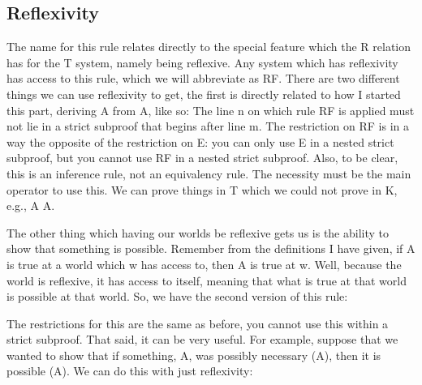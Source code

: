 \subsection{Reflexivity}

The name for this rule relates directly to the special feature which the R relation has for the T system, namely being reflexive. Any system which has reflexivity has access to this rule, which we will abbreviate as RF. There are two different things we can use reflexivity to get, the first is directly related to how I started this part, deriving A from \ebox A, like so:
The line n on which rule RF is applied must not lie in a strict subproof that begins after line m. The restriction on RF is in a way the opposite of the restriction on \ebox E: you can only use \ebox E in a nested strict subproof, but you cannot use RF in a nested strict subproof. Also, to be clear, this is an inference rule, not an equivalency rule. The necessity must be the main operator to use this. We can prove things in T which we could not prove in K, e.g., \ebox A \eif  A.
\begin{fitchproof}
\open
{}	
\close
{} 
\end{fitchproof}

The other thing which having our worlds be reflexive gets us is the ability to show that something is possible. Remember from the definitions I have given, if A is true at a world which w has access to, then \ediamond A is true at w. Well, because the world is reflexive, it has access to itself, meaning that what is true at that world is possible at that world. So, we have the second version of this rule:

The restrictions for this are the same as before, you cannot use this within a strict subproof. That said, it can be very useful. For example, suppose that we wanted to show that if something, A, was possibly necessary (\ediamond \ebox A), then it is possible (\ediamond A). We can do this with just reflexivity: 
\begin{fitchproof}
\open
{}
\open
{} 
\close
{}
\close
{}
\end{fitchproof}

